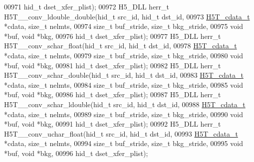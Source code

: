 \begin{DoxyCode}
00971                                      hid\_t dset\_xfer\_plist);
00972 H5\_DLL herr\_t H5T\_\_conv\_ldouble\_double(hid\_t src\_id, hid\_t dst\_id,
00973                      \hyperlink{struct_h5_t__cdata__t}{H5T\_cdata\_t} *cdata, \textcolor{keywordtype}{size\_t} nelmts,
00974                      \textcolor{keywordtype}{size\_t} buf\_stride, \textcolor{keywordtype}{size\_t} bkg\_stride,
00975                                      \textcolor{keywordtype}{void} *buf, \textcolor{keywordtype}{void} *bkg,
00976                                      hid\_t dset\_xfer\_plist);
00977 H5\_DLL herr\_t H5T\_\_conv\_schar\_float(hid\_t src\_id, hid\_t dst\_id,
00978                      \hyperlink{struct_h5_t__cdata__t}{H5T\_cdata\_t} *cdata, \textcolor{keywordtype}{size\_t} nelmts,
00979                      \textcolor{keywordtype}{size\_t} buf\_stride, \textcolor{keywordtype}{size\_t} bkg\_stride,
00980                                      \textcolor{keywordtype}{void} *buf, \textcolor{keywordtype}{void} *bkg,
00981                                      hid\_t dset\_xfer\_plist);
00982 H5\_DLL herr\_t H5T\_\_conv\_schar\_double(hid\_t src\_id, hid\_t dst\_id,
00983                      \hyperlink{struct_h5_t__cdata__t}{H5T\_cdata\_t} *cdata, \textcolor{keywordtype}{size\_t} nelmts,
00984                      \textcolor{keywordtype}{size\_t} buf\_stride, \textcolor{keywordtype}{size\_t} bkg\_stride,
00985                                      \textcolor{keywordtype}{void} *buf, \textcolor{keywordtype}{void} *bkg,
00986                                      hid\_t dset\_xfer\_plist);
00987 H5\_DLL herr\_t H5T\_\_conv\_schar\_ldouble(hid\_t src\_id, hid\_t dst\_id,
00988                      \hyperlink{struct_h5_t__cdata__t}{H5T\_cdata\_t} *cdata, \textcolor{keywordtype}{size\_t} nelmts,
00989                      \textcolor{keywordtype}{size\_t} buf\_stride, \textcolor{keywordtype}{size\_t} bkg\_stride,
00990                                      \textcolor{keywordtype}{void} *buf, \textcolor{keywordtype}{void} *bkg,
00991                                      hid\_t dset\_xfer\_plist);
00992 H5\_DLL herr\_t H5T\_\_conv\_uchar\_float(hid\_t src\_id, hid\_t dst\_id,
00993                      \hyperlink{struct_h5_t__cdata__t}{H5T\_cdata\_t} *cdata, \textcolor{keywordtype}{size\_t} nelmts,
00994                      \textcolor{keywordtype}{size\_t} buf\_stride, \textcolor{keywordtype}{size\_t} bkg\_stride,
00995                                      \textcolor{keywordtype}{void} *buf, \textcolor{keywordtype}{void} *bkg,
00996                                      hid\_t dset\_xfer\_plist);

\end{DoxyCode}
